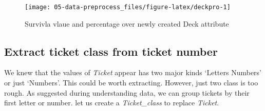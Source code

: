 \documentclass[
]{book}
\begin{document}
\begin{figure}

{\centering \texttt{[image: 05-data-preprocess\_files/figure-latex/deckpro-1]} 

}

\caption{Survivla vlaue and percentage over newly created Deck attribute}\label{fig:deckpro}
\end{figure}

\hypertarget{extract-ticket-class-from-ticket-number}{%
\subsection*{Extract ticket class from ticket number}\label{extract-ticket-class-from-ticket-number}}


We knew that the values of \emph{Ticket} appear has two major kinds `Letters Numbers' or just `Numbers'. This could be worth extracting. However, just two class is too rough. As suggested during understanding data, we can group tickets by their first letter or number. let us create a \emph{Ticket\_class} to replace \emph{Ticket}.
\end{document}

